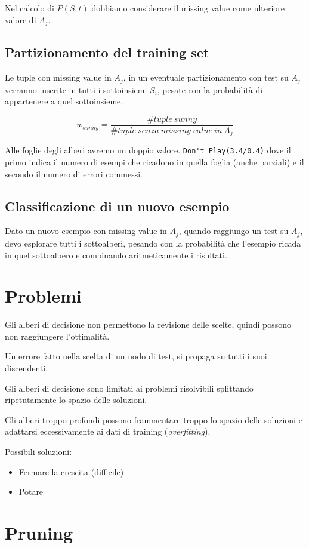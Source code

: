 \documentclass[11pt,onecolumn,a4paper,oneside]{book}
\begin{document}
Nel calcolo di $P(S,t)$ dobbiamo considerare il missing value come ulteriore valore di $A_j$.


\subsection{Partizionamento del training set}
Le tuple con missing value in $A_j$, in un eventuale partizionamento con test su $A_j$ verranno inserite in tutti i sottoinsiemi $S_i$, pesate con la probabilità di appartenere a quel sottoinsieme.

$$w_{sunny} = \frac{\#tuple~sunny}{\#tuple~senza~missing~value~in~A_j}$$

Alle foglie degli alberi avremo un doppio valore.
\verb+Don't Play(3.4/0.4)+ dove il primo indica il numero di esempi che ricadono in quella foglia (anche parziali) e il secondo il numero di errori commessi.


\subsection{Classificazione di un nuovo esempio}
Dato un nuovo esempio con missing value in $A_j$, quando raggiungo un test su $A_j$, devo esplorare tutti i sottoalberi, pesando con la probabilità che l'esempio ricada in quel sottoalbero e combinando aritmeticamente i risultati.

\section{Problemi}
Gli alberi di decisione non permettono la revisione delle scelte, quindi possono non raggiungere l'ottimalità.

Un errore fatto nella scelta di un nodo di test, si propaga su tutti i suoi discendenti.

Gli alberi di decisione sono limitati ai problemi risolvibili splittando ripetutamente lo spazio delle soluzioni.

Gli alberi troppo profondi possono frammentare troppo lo spazio delle soluzioni e adattarsi eccessivamente ai dati di training (\emph{overfitting}).

Possibili soluzioni:
\begin{itemize}
\item Fermare la crescita (difficile)
\item Potare
\end{itemize}

\section{Pruning}
\end{document}
